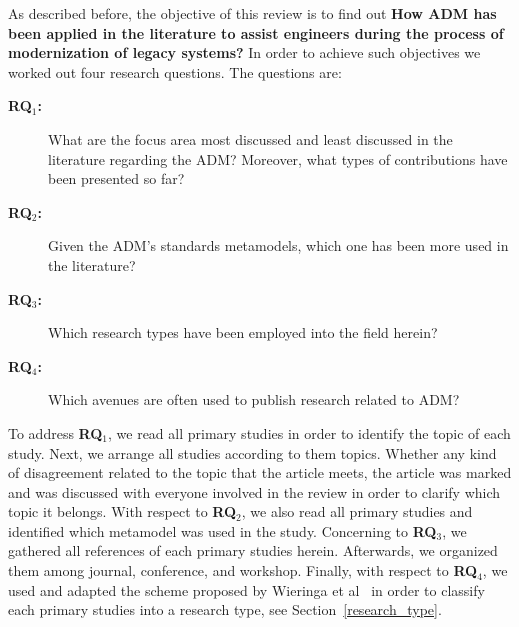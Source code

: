 

As described before, the objective of this review is to find out \textbf{How ADM has been applied in the literature to assist engineers during the process of modernization of legacy systems?} In order to achieve such objectives we worked out four research questions. The questions are:

\begin{description}

\item[\textbf{RQ$_1$:}] What are the focus area most discussed and least discussed in the literature regarding the ADM? Moreover, what types of contributions have been presented so far?

\item[\textbf{RQ$_2$:}]  Given the ADM's standards metamodels, which one has been more used in the literature?


\item[\textbf{RQ$_3$:}]  Which research types have been employed into the field herein?

\item[\textbf{RQ$_4$:}]  Which avenues are often used to publish research related to ADM?







\end{description}

To address \textbf{RQ$_1$}, we read all primary studies in order to identify the topic of each study. Next, we arrange all studies according to them topics. Whether any kind of disagreement related to the topic that the article meets, the article was marked and was discussed with everyone involved in the review in order to clarify which topic it belongs. With respect to \textbf{RQ$_2$}, we also read all primary studies and identified which metamodel was used in the study. Concerning to \textbf{RQ$_3$}, we gathered all references of each primary studies herein. Afterwards, we organized them among journal, conference, and workshop. Finally, with respect to \textbf{RQ$_4$}, we used and adapted the scheme proposed by Wieringa et al~\cite{Wieringa:2005:REP:1107677.1107683} in order to classify each primary studies into a research type, see Section~\ref{research_type}.



